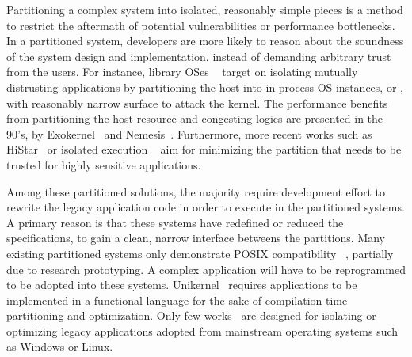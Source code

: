 Partitioning a complex system into
isolated, reasonably simple pieces
is a method
to restrict the aftermath of potential vulnerabilities or
performance bottlenecks.
In a partitioned system, developers are more likely to reason about
the soundness of the system design and implementation,
instead of demanding arbitrary trust from the users.
For instance, library OSes
~\citep{porter11drawbridge, baumann13bascule, unikernels}
target on isolating mutually distrusting applications
by partitioning the host into in-process OS instances,
or \emph{\picoprocs{}},
with reasonably narrow surface to attack the kernel.
The performance benefits
from partitioning the host resource and congesting logics
are presented in the 90's,
by Exokernel~\citep{engler95exokernel}
and Nemesis~\citep{leslie96nemesis}.
Furthermore, more recent works such as HiStar~\citep{zeldovich+histar}
or isolated execution
~\citep{flicker, trustzone, intelsgx, criswell2014virtualghost}
aim for minimizing the partition that needs to be trusted
for highly sensitive applications.



Among these partitioned solutions,
the majority require
development effort to rewrite the legacy application code
in order to execute in the partitioned systems.
A primary reason %
is that these systems
have redefined or reduced the specifications,
to gain a clean, narrow interface betweens the partitions.
Many existing partitioned systems only demonstrate POSIX compatibility
~\citep{engler95exokernel, leslie96nemesis, zeldovich+histar},
partially due to research prototyping.
A complex application
will have to be reprogrammed to be adopted into these systems.
Unikernel~\citep{unikernels} requires applications to be implemented
in a functional language for the sake of compilation-time
partitioning and optimization.
Only few works~\citep{porter11drawbridge, baumann13bascule, tsai14graphene}
are designed for isolating or optimizing
legacy applications adopted from mainstream operating systems such as Windows or Linux.


